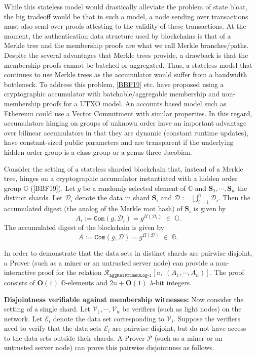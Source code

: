 \documentclass[11pt, lettersize, notitlepage, leqno, footskip=0.6cm]{article}
\newcommand{\ttt}{\texttt}
\newcommand{\bG}{\mathbb{G}}
\newcommand{\mc}{\mathcal}
\newcommand{\mb}{\mathbb}
\newcommand{\mbf}{\mathbf}
\newcommand{\lam}{\lambda}
\newcommand{\bO}{\mbf{O}}
\newcommand{\mP}{\mc{P}}
\newcommand{\V}{\mc{V}}
\newcommand{\vs}{\vspace{-0.15cm}}
\newcommand{\noin}{\noindent}
\numberwithin{equation}{section}
\begin{document}
While this stateless model would drastically alleviate the problem of state bloat, the big tradeoff would be that in such a model, a node sending over transactions must also send over proofs attesting to the validity of these transactions. At the moment, the authentication data structure used by blockchains is that of a Merkle tree and the membership proofs are what we call Merkle branches/paths. Despite the several advantages that Merkle trees provide, a drawback is that the membership proofs cannot be batched or aggregated. Thus, a stateless model that continues to use Merkle trees as the accumulator would suffer from a bandwidth bottleneck. To address this problem, \hyperlink{BBF19}{[BBF19]} etc. have proposed using a cryptographic accumulator with batchable/aggregable membership and non-membership proofs for a UTXO model. An accounts based model such as Ethereum could use a Vector Commitment with similar properties. In this regard, accumulators hinging on groups of unknown order have an important advantage over bilinear accumulators in that they are dynamic (constant runtime updates), have constant-sized public parameters and are transparent if the underlying hidden order group is a class group or a genus three Jacobian.

Consider the setting of a stateless sharded blockchain that, instead of a Merkle tree, hinges on a cryptographic accumulator instantiated with a hidden order group $\mb{G}$ ([BBF19]). Let $g$ be a randomly selected element of $\mb{G}$ and $\mbf{S}_1,\cdots, \mbf{S}_n$ the distinct shards. Let $\mc{D}_i$ denote the data in shard $\mbf{S}_i$ and $\mc{D}:= \bigcup\limits_{i=1}^n \mc{D}_i$. Then the accumulated digest (the analog of the Merkle root hash) of $\mbf{S}_i$ is given by \vs $$A_i:= \ttt{Com}(g, \mc{D}_i) = g^{\Pi(\mc{D}_i)}\;\in\;\bG.$$  The accumulated digest of the blockchain is given by \vs $$A:= \ttt{Com}(g, \mc{D}) = g^{\Pi(\mc{D})}\;\in\;\bG.$$

In order to demonstrate that the data sets in distinct shards are pairwise disjoint, a Prover (such as a miner or an untrusted server node) can provide a non-interactive proof for the relation \hyperlink{RP1}{$\mc{R}_{\ttt{AggRelPrimeDLog-1}}[a,\;(A_1,\cdots,A_n) ].$} The proof consists of $\bO(1)$ $\bG$-elements and $2n+\bO(1)$ $\lam$-bit integers.


\bigskip

\noin \textbf{Disjointness verifiable against membership witnesses:} Now consider the setting of a single shard. Let $\V_1,\cdots,\V_n$ be verifiers (such as light nodes) on the network. Let $\mc{E}_i$ denote the data set corresponding to $\V_i$. Suppose the verifiers need to verify that the data sets $\mc{E}_i$ are pairwise disjoint, but do not have access to the data sets outside their shards. A Prover $\mP$ (such as a miner or an untrusted server node) can prove this pairwise disjointness as follows.\vspace{0.1cm}
\end{document}
